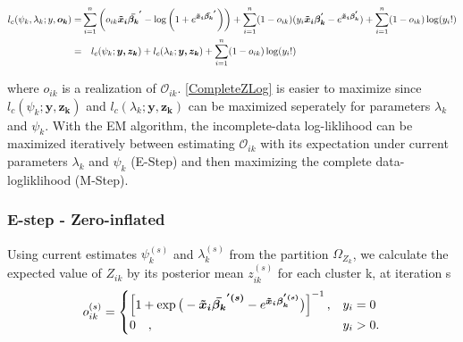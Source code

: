 \documentclass[11pt,letterpaper]{article}
\numberwithin{equation}{section}
\numberwithin{equation}{section}
\numberwithin{equation}{section}
\begin{document}
\begin{align}
l_c(\psi_k,\lambda_k;y,\bm{o_k }) = & \sum_{i=1}^n \left( o_{ik}\bm{\bm{\tilde{x}}_i \bar{\beta_k }^{'}} - \log\left(1+ e^{\bm{ \bm{\tilde{x}}_i \bar{\beta_k }^{'}}}\right) \right) + \sum_{i=1}^n (1-o_{ik}) (y_i \bm{ \bm{\tilde{x}}_i \beta_k^{'} } - e^{\bm{\bm{\tilde{x}}_i \beta_k^{'}}}) + \sum_{i=1}^n (1-o_{ik})\log(y_i!) \nonumber \\
=  & \quad l_c(\psi_k;\bm{y,z_k}) + l_c(\lambda_k; \bm{y,z_k}) + \sum_{i=1}^n (1- o_{ik})\log(y_i!) \label{CompleteZLog}
\end{align}

where ${o_{ik}}$ is a realization of $ \mathcal{O}_{ik} $. \eqref{CompleteZLog} is easier to maximize since $l_c(\psi_k;\bm{y,z_{k}})$ and $l_c(\lambda_k; \bm{y,z_k}) $ can be maximized seperately for parameters $\lambda_k$ and $\psi_k$. With the EM algorithm, the incomplete-data log-liklihood can be maximized iteratively between estimating $\mathcal{O}_{ik}$ with its expectation under current parameters $\lambda_k$ and $\psi_k$ (E-Step) and then maximizing the complete data-logliklihood (M-Step).

\subsubsection{E-step -  Zero-inflated}%

Using current estimates $\psi_k^{(s)}$ and $ \lambda_k^{(s)} $ from the partition $ \Omega_{Z_k}$, we calculate the expected value of ${Z_{ik}}$ by its posterior mean ${z_{ik}^{(s)}}$ for each cluster k, at iteration s
\begin{align*}
o_{ik}^{(s)} = \begin{cases}  \left[ 1 + \exp{\big(-\bm{\bm{\tilde{x}}_i \bar{\beta_k}^{'(s)}} - e^ {\bm{\bm{\tilde{x}}_i \beta_k^{'(s)}}} \big) } \right]^{-1}, &  y_{i} = 0 \\
  0 \quad , & y_{i}> 0 .
\end{cases}
\end{align*}
\end{document}
